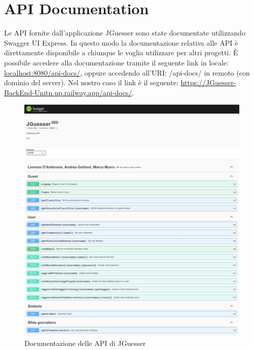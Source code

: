 \section{API Documentation}
Le API fornite dall’applicazione JGuesser sono
state documentate utilizzando Swagger UI Express. In questo
modo la documentazione relativa alle API è direttamente disponibile a chiunque le voglia utilizzare per altri progetti. È possibile accedere alla documentazione tramite il seguente link in locale: \href{localhost:8080/api-docs/}{localhost:8080/api-docs/}, oppure accedendo all'URI: /api-docs/ in remoto (con dominio del server). Nel nostro caso il link è il seguente: \href{https://JGuesser-BackEnd-Unitn.up.railway.app/api-docs/}{https://JGuesser-BackEnd-Unitn.up.railway.app/api-docs/}.

\begin{figure}[!h]
\centering
\includegraphics[scale=0.5]{images/swagger_api_documentation.jpg}
\caption{Documentazione delle API di JGuesser}
\label{fig:swagger_api_documentation}
\end{figure}
\noindent